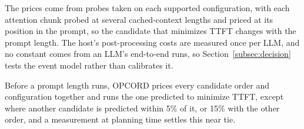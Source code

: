 The prices come from probes taken on each supported configuration, with each attention chunk probed at several cached-context lengths and priced at its position in the prompt, so the candidate that minimizes TTFT changes with the prompt length.
The host's post-processing costs are measured once per LLM, and no constant comes from an LLM's end-to-end runs, so Section~\ref{subsec:decision} tests the event model rather than calibrates it.

Before a prompt length runs, OPCORD prices every candidate order and configuration together and runs the one predicted to minimize TTFT, except where another candidate is predicted within 5\% of it, or 15\% with the other order, and a measurement at planning time settles this near tie.
